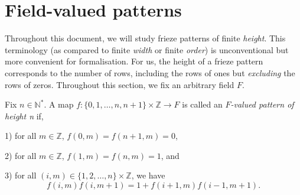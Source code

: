 \chapter{Field-valued patterns}\label{s:fp}
Throughout this document, we will study frieze patterns of finite {\it height}. This terminology (as compared to finite {\it width} or 
finite {\it order}) is unconventional but more convenient for formalisation. For us, the height of a frieze pattern corresponds 
to the number of rows, including the rows of ones but {\it excluding} the rows of zeros.
Throughout this section, we fix an arbitrary field $F$. 


\begin{definition}
    \label{def:pattern_n}
    \leanok
        Fix $n \in \mathbb{N}^*$. A map $f : \{0,1,\ldots , n,n+1\} \times \mathbb{Z} \longrightarrow F$ is called
        an \textit{$F$-valued pattern of height n} if, 
        
        1) for all $m \in \mathbb{Z}$, $ f(0,m) = f (n+1,m) = 0$, 
        
        2) for all $m \in \mathbb{Z}$, $ f(1,m) = f (n,m) = 1$, and 
        
        3) for all $(i,m) \in \{1,2,\ldots , n\} \times \mathbb{Z}$, we have
        \begin{equation}\label{eq:diamond}
            f(i,m) f(i,m+1) = 1 + f(i+1,m) f(i-1, m+1).
        \end{equation}
    \end{definition}

